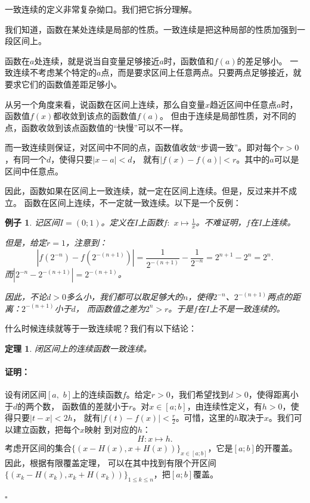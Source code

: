 \documentclass[12pt,UTF8]{ctexbook}
\newtheorem{tm}{定理}[section]
\newtheorem{ex}{例子}[section]
\renewenvironment{proof}{\paragraph{\textbf{证明：}}}{\hfill$\square$}
\begin{document}
\begin{appendix}
一致连续的定义非常复杂拗口。我们把它拆分理解。

我们知道，函数在某处连续是局部的性质。一致连续是把这种局部的性质加强到一段区间上。

函数在$a$处连续，就是说当自变量足够接近$a$时，函数值和$f(a)$的差足够小。
一致连续不考虑某个特定的$a$点，而是要求区间上任意两点。只要两点足够接近，就要求它们的函数值差距足够小。

从另一个角度来看，说函数在区间上连续，那么自变量$x$趋近区间中任意点$a$时，函数值$f(x)$都收敛到该点的函数值$f(a)$。
但由于连续是局部性质，对不同的点，函数收敛到该点函数值的“快慢”可以不一样。

而一致连续则保证，对区间中不同的点，函数值收敛“步调一致”。即对每个$r>0$，有同一个$d$，使得只要$|x - a| < d$，
就有$|f(x) - f(a)| < r$。其中的$a$可以是区间中任意点。

因此，函数如果在区间上一致连续，就一定在区间上连续。但是，反过来并不成立。
函数在区间上连续，不一定就一致连续。以下是一个反例：

\begin{ex}
    记区间$I = (0; 1)$。定义在$I$上函数$f: \,\,x \mapsto \frac{1}{x}$。不难证明，$f$在$I$上连续。

    但是，给定$r = 1$，注意到：
    $$ \left|f\left(2^{-n}\right) - f\left(2^{-(n+1)}\right)\right| = \frac{1}{2^{-(n+1)}} - \frac{1}{2^{-n}} = 2^{n+1} - 2^{n} = 2^n. $$
    而$\left|2^{-n} - 2^{-(n+1)}\right| = 2^{-(n+1)}$。

    因此，不论$d>0$多么小，我们都可以取足够大的$n$，使得$2^{-n}$、$2^{-(n+1)}$两点的距离：$2^{-(n+1)}$小于$d$，
    而函数值之差为$2^n > r$。于是$f$在$I$上不是一致连续的。
\end{ex}

什么时候连续就等于一致连续呢？我们有以下结论：

\begin{tm}
    闭区间上的连续函数一致连续。
\end{tm}
\begin{proof}
    设有闭区间$[a,\,\,b]$上的连续函数$f$。给定$r>0$，我们希望找到$d>0$，使得距离小于$d$的两个数，
    函数值的差就小于$r$。对$x\in[a; b]$，由连续性定义，有$h>0$，使得只要$|t - x| < 2h$，
    就有$|f(t) - f(x)| < \frac{r}{2}$。可惜，这里的$h$取决于$x$。我们可以建立函数，把每个$x$映射
    到对应的$h$：
    $$ H: x \mapsto h. $$
    考虑开区间的集合$\{(x - H(x), x + H(x))\}_{x\in[a; b]}$，它是$[a; b]$的开覆盖。因此，根据有限覆盖定理，
    可以在其中找到有限个开区间$\{(x_k - H(x_k), x_k + H(x_k))\}_{1\leqslant k\leqslant n}$，把$[a; b]$覆盖。
    

\end{proof}
\end{appendix}
\end{document}
